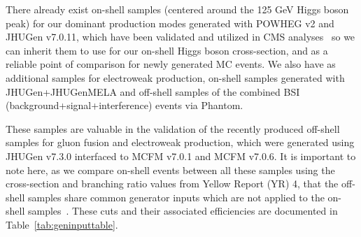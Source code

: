 There already exist on-shell samples (centered around the 125 GeV Higgs boson peak) for our dominant production modes generated with POWHEG v2 and JHUGen v7.0.11, which have been validated and utilized in CMS analyses~\cite{Sirunyan:2019twz, Sirunyan:2021rug, Sirunyan:2765059} so we can inherit them to use for our on-shell Higgs boson cross-section, and as a reliable point of comparison for newly generated MC events. We also have as additional samples for electroweak production, on-shell samples generated with JHUGen+JHUGenMELA and off-shell samples of the combined BSI (background+signal+interference) events via Phantom.

These samples are valuable in the validation of the recently produced off-shell samples for gluon fusion and electroweak production, which were generated using JHUGen v7.3.0 interfaced to MCFM v7.0.1 and MCFM v7.0.6. It is important to note here, as we compare on-shell events between all these samples using the cross-section and branching ratio values from Yellow Report (YR) 4, that the off-shell samples share common generator inputs which are not applied to the on-shell samples~\cite{YellowRep4}. These cuts and their associated efficiencies are documented in Table~\ref{tab:geninputtable}.

